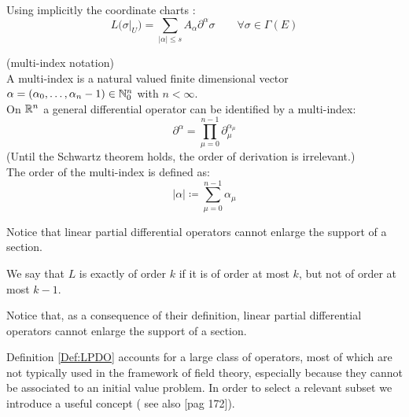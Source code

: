 \documentclass[a4paper,12pt]{scrartcl}    %
\begin{document}
		\begin{notationfix}
			Using implicitly the coordinate charts \cite{advances}:
			\begin{displaymath}
				L \big(\sigma \big\vert_U\big) = \sum_{\vert \alpha \vert \leq s} A_\alpha \partial^\alpha \sigma \qquad \forall \sigma \in \Gamma(E)
			\end{displaymath}
		\end{notationfix}
		\begin{remark}
			(multi-index notation)
			\\
			A multi-index is a natural valued finite dimensional vector $\alpha = ( \alpha_0, \ldots, \alpha_n-1) \in \mathbb{N}^n_0$ with $n<\infty$.
			\\
			On $\mathbb{R}^n$ a general differential operator can be identified by a multi-index:
			\begin{displaymath}
				\partial^\alpha = \prod_{\mu = 0}^{n-1} \partial_\mu ^{\alpha_\mu}
			\end{displaymath}
			(Until the Schwartz theorem holds, the order of derivation is irrelevant.)
			\\
			The order of the multi-index is defined as:
			\begin{displaymath}
				\vert \alpha \vert \coloneqq \sum_{\mu=0}^{n-1} \alpha_\mu
			\end{displaymath}
		\end{remark}
	
		\begin{observation}
			Notice that linear partial differential operators cannot enlarge the support of a section.
		\end{observation}		
		
		
		\begin{notationfix}
			We say that $L$ is exactly of order $k$ if it is of order at most $k$, but not of order at most $k-1$.
		\end{notationfix}
		\begin{observation}
			Notice that, as a consequence of their definition, linear partial differential operators cannot enlarge the
support of a section.
		\end{observation}
		
		Definition \ref{Def:LPDO} accounts for a large class of operators, most of which are not typically used in the framework of field theory, especially because they cannot be associated to an initial value problem. 
		In order to select a relevant subset we introduce a useful concept ( see also \cite{barwav}[pag 172]).
		
\end{document}
